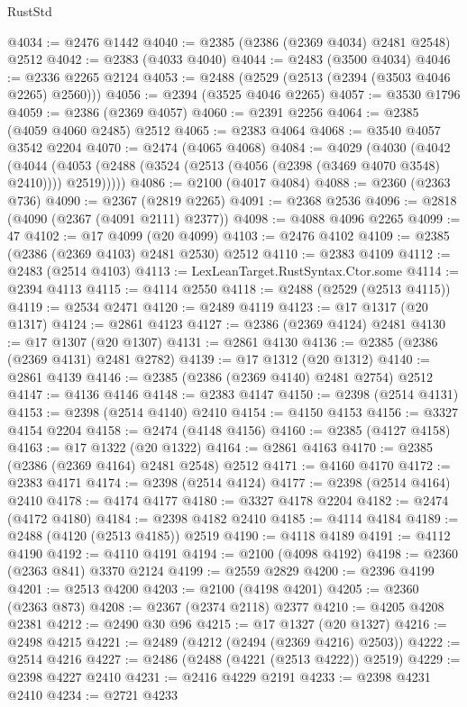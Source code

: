 \begin{lexlean}{RustStd}
\begin{coremodule}
@4034 := @2476 @1442
@4040 := @2385 (@2386 (@2369 @4034) @2481 @2548) @2512
@4042 := @2383 (@4033 @4040)
@4044 := @2483 (@3500 @4034)
@4046 := @2336 @2265 @2124
@4053 := @2488 (@2529 (@2513 (@2394 (@3503 @4046 @2265) @2560)))
@4056 := @2394 (@3525 @4046 @2265)
@4057 := @3530 @1796
@4059 := @2386 (@2369 @4057)
@4060 := @2391 @2256
@4064 := @2385 (@4059 @4060 @2485) @2512
@4065 := @2383 @4064
@4068 := @3540 @4057 @3542 @2204
@4070 := @2474 (@4065 @4068)
@4084 := @4029
    (@4030
      (@4042
        (@4044 (@4053 (@2488 (@3524 (@2513 (@4056 (@2398 (@3469 @4070 @3548) @2410)))) @2519)))))
@4086 := @2100 (@4017 @4084)
@4088 := @2360 (@2363 @736)
@4090 := @2367 (@2819 @2265)
@4091 := @2368 @2536
@4096 := @2818 (@4090 (@2367 (@4091 @2111) @2377))
@4098 := @4088 @4096 @2265
@4099 := 47
@4102 := @17 @4099 (@20 @4099)
@4103 := @2476 @4102
@4109 := @2385 (@2386 (@2369 @4103) @2481 @2530) @2512
@4110 := @2383 @4109
@4112 := @2483 (@2514 @4103)
@4113 := LexLeanTarget.RustSyntax.Ctor.some
@4114 := @2394 @4113
@4115 := @4114 @2550
@4118 := @2488 (@2529 (@2513 @4115))
@4119 := @2534 @2471
@4120 := @2489 @4119
@4123 := @17 @1317 (@20 @1317)
@4124 := @2861 @4123
@4127 := @2386 (@2369 @4124) @2481
@4130 := @17 @1307 (@20 @1307)
@4131 := @2861 @4130
@4136 := @2385 (@2386 (@2369 @4131) @2481 @2782)
@4139 := @17 @1312 (@20 @1312)
@4140 := @2861 @4139
@4146 := @2385 (@2386 (@2369 @4140) @2481 @2754) @2512
@4147 := @4136 @4146
@4148 := @2383 @4147
@4150 := @2398 (@2514 @4131)
@4153 := @2398 (@2514 @4140) @2410
@4154 := @4150 @4153
@4156 := @3327 @4154 @2204
@4158 := @2474 (@4148 @4156)
@4160 := @2385 (@4127 @4158)
@4163 := @17 @1322 (@20 @1322)
@4164 := @2861 @4163
@4170 := @2385 (@2386 (@2369 @4164) @2481 @2548) @2512
@4171 := @4160 @4170
@4172 := @2383 @4171
@4174 := @2398 (@2514 @4124)
@4177 := @2398 (@2514 @4164) @2410
@4178 := @4174 @4177
@4180 := @3327 @4178 @2204
@4182 := @2474 (@4172 @4180)
@4184 := @2398 @4182 @2410
@4185 := @4114 @4184
@4189 := @2488 (@4120 (@2513 @4185)) @2519
@4190 := @4118 @4189
@4191 := @4112 @4190
@4192 := @4110 @4191
@4194 := @2100 (@4098 @4192)
@4198 := @2360 (@2363 @841) @3370 @2124
@4199 := @2559 @2829
@4200 := @2396 @4199
@4201 := @2513 @4200
@4203 := @2100 (@4198 @4201)
@4205 := @2360 (@2363 @873)
@4208 := @2367 (@2374 @2118) @2377
@4210 := @4205 @4208 @2381
@4212 := @2490 @30 @96
@4215 := @17 @1327 (@20 @1327)
@4216 := @2498 @4215
@4221 := @2489 (@4212 (@2494 (@2369 @4216) @2503))
@4222 := @2514 @4216
@4227 := @2486 (@2488 (@4221 (@2513 @4222)) @2519)
@4229 := @2398 @4227 @2410
@4231 := @2416 @4229 @2191
@4233 := @2398 @4231 @2410
@4234 := @2721 @4233

\end{coremodule}
\end{lexlean}
